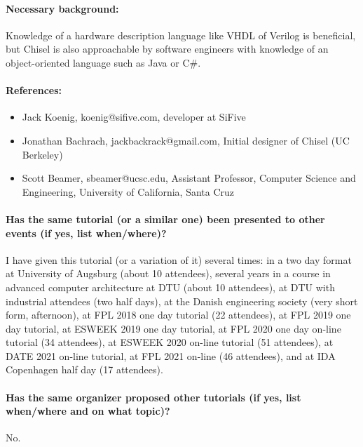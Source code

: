 \documentclass{article}
\begin{document}
 \paragraph{Necessary background:}

Knowledge of a hardware description language like VHDL of Verilog is beneficial, but Chisel is also
approachable by software engineers with knowledge of an object-oriented language such as Java or C\#.

 \paragraph{References:}

\begin{itemize}
\item Jack Koenig, koenig@sifive.com, developer at SiFive
\item Jonathan Bachrach, jackbackrack@gmail.com, Initial designer of Chisel (UC Berkeley)
\item Scott Beamer, sbeamer@ucsc.edu, Assistant Professor, Computer Science and Engineering, University of California, Santa Cruz
\end{itemize}

\paragraph{Has the same tutorial (or a similar one) been presented to other events (if yes, list when/where)?}

I have given this tutorial (or a variation of it) several times:
in a two day format at University of Augsburg (about 10 attendees), several years
in a course in advanced computer architecture at DTU (about 10 attendees),
at DTU with industrial attendees (two half days),
at the Danish engineering society (very short form, afternoon),
at FPL 2018 one day tutorial (22 attendees), at FPL 2019 one day tutorial,
at ESWEEK 2019 one day tutorial, at FPL 2020 one day on-line tutorial (34 attendees),
at ESWEEK 2020 on-line tutorial (51 attendees),
at DATE 2021 on-line tutorial,
at FPL 2021 on-line (46 attendees),
and at IDA Copenhagen half day (17 attendees).

\paragraph{Has the same organizer proposed other tutorials (if yes, list when/where and on what topic)?}

No.
\end{document}
